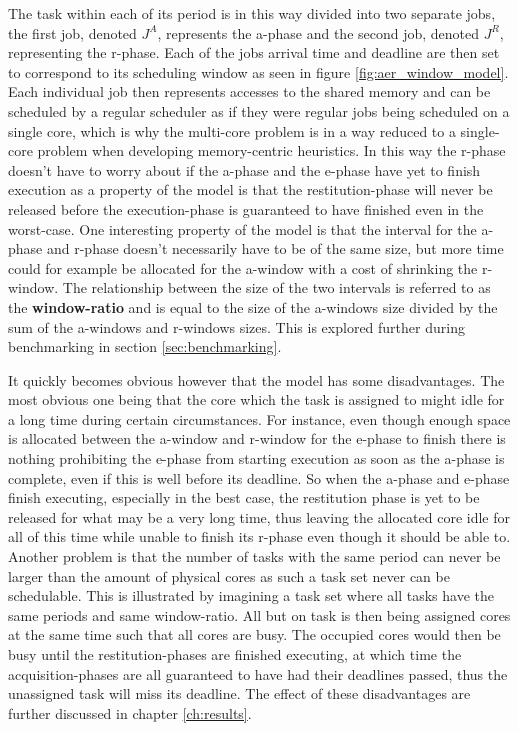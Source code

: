 \documentclass{kththesis}
\begin{document}
The task within each of its period is in this way divided into two separate jobs, the first job,
denoted $ J^{A} $, represents the \acrshort{a}-phase and the second job, denoted $ J^{R} $, representing
the \acrshort{r}-phase. Each of the jobs arrival time and deadline are then set to correspond to its
scheduling window as seen in figure \ref{fig:aer_window_model}. Each individual job then represents
accesses to the shared memory and can be scheduled by a regular scheduler as if they were regular
jobs being scheduled on a single core, which is why the multi-core problem is in a way reduced to a
single-core problem when developing memory-centric heuristics. In this way the \acrshort{r}-phase
doesn't have to worry about if the \acrshort{a}-phase and the \acrshort{e}-phase have yet to finish
execution as a property of the model is that the restitution-phase will never be released before the
execution-phase is guaranteed to have finished even in the worst-case. One interesting property of the
model is that the interval for the \acrshort{a}-phase and \acrshort{r}-phase doesn't necessarily
have to be of the same size, but more time could for example be allocated for the
\acrshort{a}-window with a cost of shrinking the \acrshort{r}-window. The relationship between the
size of the two intervals is referred to as the \textbf{window-ratio} and is equal to the size of
the \acrshort{a}-windows size divided by the sum of the \acrshort{a}-windows and
\acrshort{r}-windows sizes. This is explored further during benchmarking in section
\ref{sec:benchmarking}.

It quickly becomes obvious however that the model has some disadvantages. The most obvious one being
that the core which the task is assigned to might idle for a long time during certain circumstances.
For instance, even though enough space is allocated between the \acrshort{a}-window and
\acrshort{r}-window for the \acrshort{e}-phase to finish there is nothing prohibiting the
\acrshort{e}-phase from starting execution as soon as the \acrshort{a}-phase is complete, even if
this is well before its deadline. So when the \acrshort{a}-phase and \acrshort{e}-phase finish
executing, especially in the best case, the restitution phase is yet to be released for what may be
a very long time, thus leaving the allocated core idle for all of this time while unable to finish
its \acrshort{r}-phase even though it should be able to. Another problem is that the number of tasks
with the same period can never be larger than the amount of physical cores as such a task set never
can be schedulable. This is illustrated by imagining a task set where all tasks have the same
periods and same window-ratio. All but on task is then being assigned cores at the same time such
that all cores are busy. The occupied cores would then be busy until the restitution-phases are
finished executing, at which time the acquisition-phases are all guaranteed to have had their
deadlines passed, thus the unassigned task will miss its deadline. The effect of these disadvantages
are further discussed in chapter \ref{ch:results}.
\end{document}
